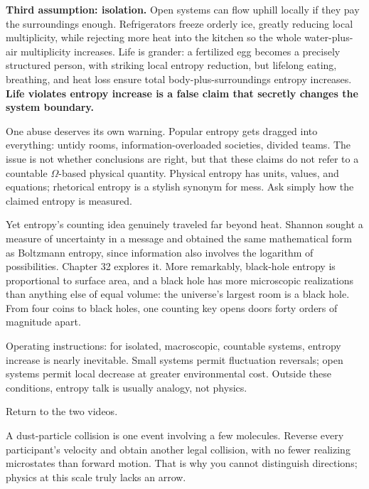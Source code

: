 \textbf{Third assumption: isolation.} Open systems can flow uphill locally if they pay the surroundings enough. Refrigerators freeze orderly ice, greatly reducing local multiplicity, while rejecting more heat into the kitchen so the whole water-plus-air multiplicity increases. Life is grander: a fertilized egg becomes a precisely structured person, with striking local entropy reduction, but lifelong eating, breathing, and heat loss ensure total body-plus-surroundings entropy increases. \textbf{Life violates entropy increase is a false claim that secretly changes the system boundary.}

One abuse deserves its own warning. Popular entropy gets dragged into everything: untidy rooms, information-overloaded societies, divided teams. The issue is not whether conclusions are right, but that these claims do not refer to a countable \(\Omega\)-based physical quantity. Physical entropy has units, values, and equations; rhetorical entropy is a stylish synonym for mess. Ask simply how the claimed entropy is measured.

Yet entropy's counting idea genuinely traveled far beyond heat. Shannon sought a measure of uncertainty in a message and obtained the same mathematical form as Boltzmann entropy, since information also involves the logarithm of possibilities. Chapter 32 explores it. More remarkably, black-hole entropy is proportional to surface area, and a black hole has more microscopic realizations than anything else of equal volume: the universe's largest room is a black hole. From four coins to black holes, one counting key opens doors forty orders of magnitude apart.

\begin{mainline}
Operating instructions: for isolated, macroscopic, countable systems, entropy increase is nearly inevitable. Small systems permit fluctuation reversals; open systems permit local decrease at greater environmental cost. Outside these conditions, entropy talk is usually analogy, not physics.
\end{mainline}


Return to the two videos.

A dust-particle collision is one event involving a few molecules. Reverse every participant's velocity and obtain another legal collision, with no fewer realizing microstates than forward motion. That is why you cannot distinguish directions; physics at this scale truly lacks an arrow.


